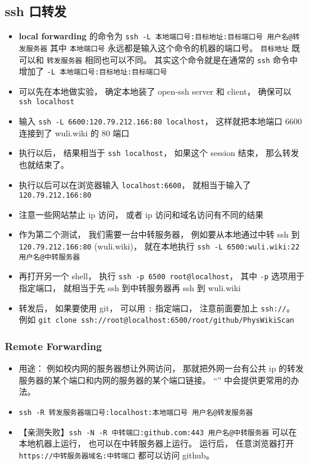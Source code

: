 \subsection{ssh 口转发}
\begin{itemize}
\item \textbf{local forwarding} 的命令为 \verb`ssh -L 本地端口号:目标地址:目标端口号 用户名@转发服务器` 其中 \verb`本地端口号` 永远都是输入这个命令的机器的端口号。 \verb`目标地址` 既可以和 \verb`转发服务器` 相同也可以不同。 其实这个命令就是在通常的 \verb`ssh` 命令中增加了 \verb`-L 本地端口号:目标地址:目标端口号`
\item 可以先在本地做实验， 确定本地装了 open-ssh server 和 client， 确保可以 \verb`ssh localhost`
\item 输入 \verb`ssh -L 6600:120.79.212.166:80 localhost`， 这样就把本地端口 6600 连接到了 wuli.wiki 的 80 端口
\item 执行以后， 结果相当于 \verb`ssh localhost`， 如果这个 session 结束， 那么转发也就结束了。
\item 执行以后可以在浏览器输入 \verb`localhost:6600`， 就相当于输入了 \verb`120.79.212.166:80`
\item 注意一些网站禁止 ip 访问， 或者 ip 访问和域名访问有不同的结果

\item 作为第二个测试， 我们需要一台中转服务器， 例如要从本地通过中转 ssh 到 \verb|120.79.212.166:80| (wuli.wiki)， 就在本地执行 \verb`ssh -L 6500:wuli.wiki:22 用户名@中转服务器`
\item 再打开另一个 shell， 执行 \verb`ssh -p 6500 root@localhost`， 其中 \verb`-p` 选项用于指定端口， 就相当于先 ssh 到中转服务器再 ssh 到 wuli.wiki

\item 转发后， 如果要使用 git， 可以用 \verb`:` 指定端口， 注意前面要加上 \verb`ssh://`。  例如 \verb`git clone ssh://root@localhost:6500/root/github/PhysWikiScan`
\end{itemize}

\subsubsection{Remote Forwarding}
\begin{itemize}
\item 用途： 例如校内网的服务器想让外网访问， 那就把外网一台有公共 ip 的转发服务器的某个端口和内网的服务器的某个端口链接。 “” 中会提供更常用的办法。
\item \verb`ssh -R 转发服务器端口号:localhost:本地端口号 用户名@转发服务器`
\item 【亲测失败】\verb|ssh -N -R 中转端口:github.com:443 用户名@中转服务器| 可以在本地机器上运行， 也可以在中转服务器上运行。 运行后， 任意浏览器打开 \verb|https://中转服务器域名:中转端口| 都可以访问 github。
\end{itemize}
